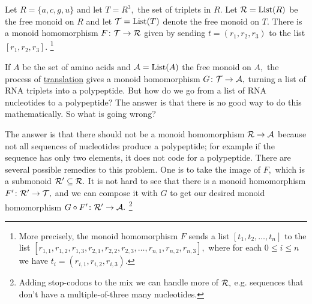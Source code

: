 \documentclass[../main/CT4S-EN-RU]{subfiles}
\begin{document}
\begin{applicationENG}\label{app:RNA reader 1}
Let $R=\{a,c,g,u\}$ and let $T=R^3,$ the set of triplets in $R.$ Let $\mathcal{R}=\operatorname{List}(R)$ be the free monoid on $R$ and let $\mathcal{T}=\operatorname{List}(T)$ denote the free monoid on $T.$ There is a monoid homomorphism $F\colon\mathcal{T}\rightarrow\mathcal{R}$ given by sending $t=(r_1,r_2,r_3)$ to the list $[r_1,r_2,r_3].$
\footnote{More precisely, the monoid homomorphism $F$ sends a list $[t_1,t_2,\ldots,t_n]$ to the list $[r_{1,1},r_{1,2},r_{1,3},r_{2,1},r_{2,2},r_{2,3},\ldots,r_{n,1},r_{n,2},r_{n,3}],$ where for each $0\leq i\leq n$ we have $t_i=(r_{i,1},r_{i,2},r_{i,3}).$}

If $A$ be the set of amino acids and $\mathcal{A}=\operatorname{List}(A)$ the free monoid on $A,$ the process of \href{http://en.wikipedia.org/wiki/Translation_(biology)}{\text translation} gives a monoid homomorphism $G\colon\mathcal{T}\rightarrow\mathcal{A},$ turning a list of RNA triplets into a polypeptide. But how do we go from a list of RNA nucleotides to a polypeptide? The answer is that there is no good way to do this mathematically. So what is going wrong?

The answer is that there should not be a monoid homomorphism $\mathcal{R}\rightarrow\mathcal{A}$ because not all sequences of nucleotides produce a polypeptide; for example if the sequence has only two elements, it does not code for a polypeptide. There are several possible remedies to this problem. One is to take the image of $F,$ which is a submonoid $\mathcal{R}'\subseteq\mathcal{R}.$ It is not hard to see that there is a monoid homomorphism $F'\colon\mathcal{R}'\rightarrow\mathcal{T},$ and we can compose it with $G$ to get our desired monoid homomorphism $G\circ F'\colon\mathcal{R}'\rightarrow\mathcal{A}.$
\footnote{Adding stop-codons to the mix we can handle more of $\mathcal{R},$ e.g. sequences that don't have a multiple-of-three many nucleotides.}
\end{applicationENG}
\end{document}
